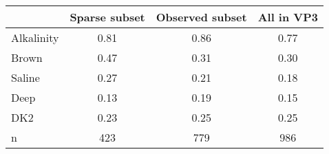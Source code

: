 \begin{tabular}{lccc}
\toprule
 & Sparse subset & Observed subset & All in VP3 \\
\midrule
Alkalinity & 0.81 & 0.86 & 0.77 \\
Brown & 0.47 & 0.31 & 0.30 \\
Saline & 0.27 & 0.21 & 0.18 \\
Deep & 0.13 & 0.19 & 0.15 \\
DK2 & 0.23 & 0.25 & 0.25 \\
n & 423 & 779 & 986 \\
\bottomrule
\end{tabular}

